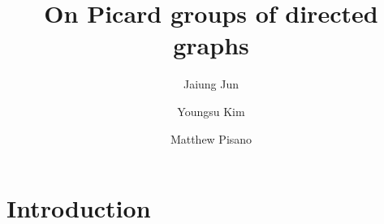 \documentclass[11pt,reqno]{amsart}
\DeclareMathOperator{\Pic}{Pic}
\DeclareMathOperator{\Jac}{Jac}
\theoremstyle{definition}
\newtheorem*{goal}{\textbf{Goal}}
\theoremstyle{plain}
\begin{document}
\title{On Picard groups of directed graphs}

\author{Jaiung Jun}
\address{Department of Mathematics, State University of New York at New Paltz, NY 12561, USA}

\author{Youngsu Kim}
\address{Department of Mathematics, California State University San Bernardino, San Bernardino, CA 92407}

\author{Matthew Pisano}
\address{Department of Mathematics, State University of New York at New Paltz, NY 12561, USA}



\maketitle

\section{Introduction}
\end{document}
